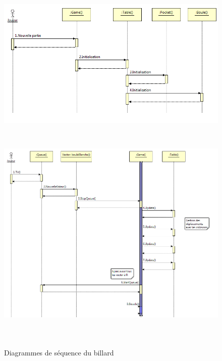 \begin{figure}[h]
 \centering
 \includegraphics[height=6.5cm]{../umls/UML_images/Billard/sequence1} \hfill
 \includegraphics[height=11cm]{../umls/UML_images/Billard/sequence2} \hfill
 \caption{Diagrammes de séquence du billard}
\end{figure}

